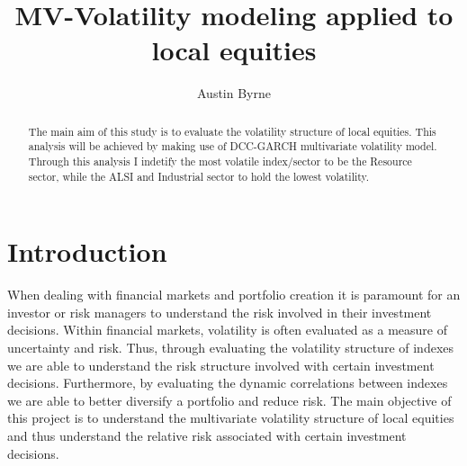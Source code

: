 \documentclass[12pt,preprint, authoryear]{elsarticle}
\numberwithin{equation}{section}
\numberwithin{figure}{section}
\numberwithin{table}{section}
\begin{document}
\begin{frontmatter}  %

\title{MV-Volatility modeling applied to local equities}





\author[Add1]{Austin Byrne}





\address[Add1]{Stellenbosch University}


\begin{abstract}
\small{
The main aim of this study is to evaluate the volatility structure of
local equities. This analysis will be achieved by making use of
DCC-GARCH multivariate volatility model. Through this analysis I
indetify the most volatile index/sector to be the Resource sector, while
the ALSI and Industrial sector to hold the lowest volatility.
}
\end{abstract}

\vspace{1cm}





\vspace{0.5cm}

\end{frontmatter}

\setcounter{footnote}{0}



\pagestyle{fancy}
\chead{}
\rhead{}
\lfoot{}
\lhead{}
\cfoot{}


\headsep 35pt %




\hypertarget{introduction}{%
\section{\texorpdfstring{Introduction
\label{Introduction}}{Introduction }}\label{introduction}}

When dealing with financial markets and portfolio creation it is
paramount for an investor or risk managers to understand the risk
involved in their investment decisions. Within financial markets,
volatility is often evaluated as a measure of uncertainty and risk.
Thus, through evaluating the volatility structure of indexes we are able
to understand the risk structure involved with certain investment
decisions. Furthermore, by evaluating the dynamic correlations between
indexes we are able to better diversify a portfolio and reduce risk. The
main objective of this project is to understand the multivariate
volatility structure of local equities and thus understand the relative
risk associated with certain investment decisions.
\end{document}
